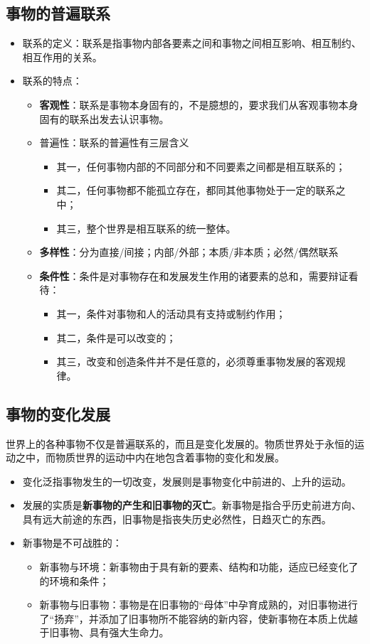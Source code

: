 \documentclass[12pt,openany]{ctexbook}
\newcommand{\zhemph}[1]{{\kaishu #1}}
\begin{document}
\subsection{事物的普遍联系}
\begin{itemize}
  \item 联系的定义：联系是指事物内部各要素之间和事物之间相互影响、相互制约、相互作用的关系。
  \item 联系的特点：
\begin{itemize}
  \item \textbf{客观性}：联系是事物本身固有的，不是臆想的，要求我们从客观事物本身固有的联系出发去认识事物。
  \item 普遍性：联系的普遍性有三层含义
\begin{itemize}
  \item 其一，任何事物\zhemph{内部的不同部分和不同要素之间}都是相互联系的；
  \item 其二，任何事物都不能孤立存在，都\zhemph{同其他事物}处于一定的联系之中；
  \item 其三，\zhemph{整个世界}是相互联系的统一整体。
\end{itemize}
  \item \textbf{多样性}：分为直接/间接；内部/外部；本质/非本质；必然/偶然联系
  \item \textbf{条件性}：条件是对事物存在和发展发生作用的诸要素的总和，需要辩证看待：
\begin{itemize}
  \item 其一，条件对事物和人的活动具有支持或制约作用；
  \item 其二，条件是可以改变的；
  \item 其三，改变和创造条件并不是任意的，必须尊重事物发展的客观规律。
\end{itemize}
\end{itemize}
\end{itemize}
\subsection{事物的变化发展}
世界上的各种事物不仅是普遍联系的，而且是变化发展的。物质世界处于永恒的运动之中，而物质世界的运动中内在地包含着事物的变化和发展。
\begin{itemize}
  \item 变化泛指事物发生的一切改变，发展则是事物变化中前进的、上升的运动。
  \item 发展的实质是\textbf{新事物的产生和旧事物的灭亡}。新事物是指合乎历史前进方向、具有远大前途的东西，旧事物是指丧失历史必然性，日趋灭亡的东西。
  \item 新事物是不可战胜的：
\begin{itemize}
  \item 新事物与环境：新事物由于具有新的要素、结构和功能，适应已经变化了的环境和条件；
  \item 新事物与旧事物：事物是在旧事物的“母体”中孕育成熟的，对旧事物进行了“扬弃”，并添加了旧事物所不能容纳的新内容，使新事物在本质上优越于旧事物、具有强大生命力。
\end{itemize}
\end{itemize}
\end{document}
